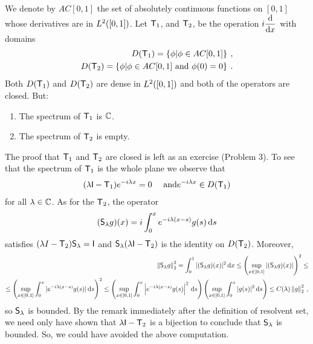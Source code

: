 \begin{example}
We denote by $AC[0, 1]$ the set of absolutely continuous functions on $[0, 1]$ whose derivatives are in $L^{2}([0,1])$. Let $\mathsf{T}_1$, and $\mathsf{T}_2$, be the operation $i \dfrac{\mathrm{d}}{\mathrm{d}x}$ with domains
\begin{align}
    D(\mathsf{T}_1) = \left \lbrace \phi | \phi \in AC[0,1] \right \rbrace \:, \\
    D(\mathsf{T}_2) = \left \lbrace \phi | \phi \in AC[0,1] \text{ and } \phi(0)=0 \right \rbrace \:.
\end{align}
Both $D(\mathsf{T}_1)$ and $D(\mathsf{T}_2)$ are dense in $L^{2}([0,1])$ and both of the operators are closed. But: \begin{enumerate}
    \item The spectrum of $\mathsf{T}_1$ is $\mathbb{C}$.
    \item The spectrum of $\mathsf{T}_2$ is empty.
\end{enumerate}

The proof that $\mathsf{T}_1$ and $\mathsf{T}_2$ are closed is left as an exercise (Problem 3). To see that the spectrum of $\mathsf{T}_1$ is the whole plane we observe that
\begin{align}
    (\lambda \mathsf{I} - \mathsf{T}_1) e^{-i \lambda x} = 0 \quad \text{ and} e^{-i \lambda x} \in D(\mathsf{T}_1)
\end{align}
for all $\lambda \in \mathbb{C}$. As for the $\mathsf{T}_2$, the operator \begin{align}
    (\mathsf{S}_\lambda g)(x) = i \int_0^x e^{-i \lambda(x-s)} g(s) \, \mathrm{d} s
\end{align}
satisfies $(\lambda I - \mathsf{T}_2) \mathsf{S}_\lambda = \mathsf{I}$ and $\mathsf{S}_\lambda (\lambda \mathsf{I} - \mathsf{T}_2)$ is the identity on $D(\mathsf{T}_2)$. Moreover, \begin{align}
    \left \Vert \mathsf{S}_\lambda g \right \Vert_2^2 = \int_0^1 |(\mathsf{S}_\lambda g)(x)|^2 \, \mathrm{d} x 
    \leq \left( \sup_{x \in [0,1]} |(\mathsf{S}_\lambda g)(x)| \right)^2 
    \leq \\ \leq
     \left( \sup_{x \in [0,1]} \int_0^x |e^{-i\lambda(x-s)} g(s)|  \, \mathrm{d} s \right)^2
    \leq \left( \sup_{x \in [0,1]} \int_0^x \left|e^{-i\lambda(x-s)} g(s) \right|^2  \, \mathrm{d} s \right)
    \left( \sup_{x \in [0,1]} \int_0^x |g(s)|^2 \, \mathrm{d} s \right)
    \leq C(\lambda) \left \Vert g \right \Vert_2^2 \:,
\end{align}
so $\mathsf{S}_\lambda$ is bounded. By the remark immediately after the definition of resolvent set, we need only have shown that $\lambda \mathsf{I} - \mathsf{T}_2$ is a bijection to conclude that $\mathsf{S}_\lambda$ is bounded. So, we could have avoided the above computation.

\end{example}

